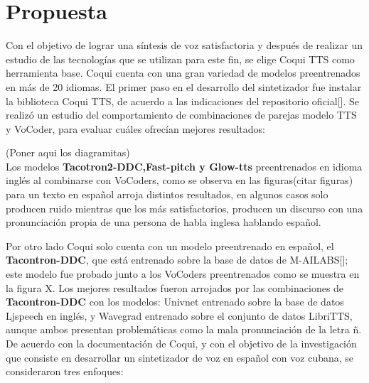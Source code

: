 \chapter{Propuesta}\label{chapter:proposal}

Con el objetivo de lograr una síntesis de voz satisfactoria y después de realizar un estudio de las tecnologías que se utilizan para este fin, se elige Coqui TTS como herramienta base. Coqui cuenta con una gran variedad de modelos preentrenados en más de 20 idiomas.  
El primer paso en el desarrollo del sintetizador fue instalar la biblioteca Coqui TTS, de acuerdo a las indicaciones del repositorio oficial[\cite{coqui-doc}]. Se realizó un estudio del comportamiento de combinaciones de parejas modelo TTS y VoCoder, para evaluar cuáles ofrecían mejores resultados:

(Poner aqui los diagramitas)\\


Los modelos \textbf{Tacotron2-DDC,Fast-pitch y Glow-tts} preentrenados en idioma inglés al combinarse con VoCoders, como se observa en las figuras(citar figuras) para un texto en español arroja distintos resultados, en algunos casos solo producen ruido mientras que los más satisfactorios, producen un discurso con una pronunciación propia de una persona de habla inglesa hablando español.

Por otro lado Coqui solo cuenta con un modelo preentrenado en español, el \textbf{Tacontron-DDC}, que está entrenado sobre la base de datos de M-AILABS[\cite{mailabs}]; este modelo fue probado junto a los VoCoders preentrenados como se muestra en la figura X. Los mejores resultados fueron arrojados por las combinaciones de \textbf{Tacontron-DDC} con los modelos: Univnet entrenado sobre la base de datos Ljspeech en inglés, y Wavegrad entrenado sobre el conjunto de datos LibriTTS, aunque ambos presentan problemáticas como la mala pronunciación de la letra ñ.\\

De acuerdo con la documentación de Coqui, y con el objetivo de la investigación que consiste en desarrollar un sintetizador de voz en español con voz cubana, se consideraron tres enfoques:

